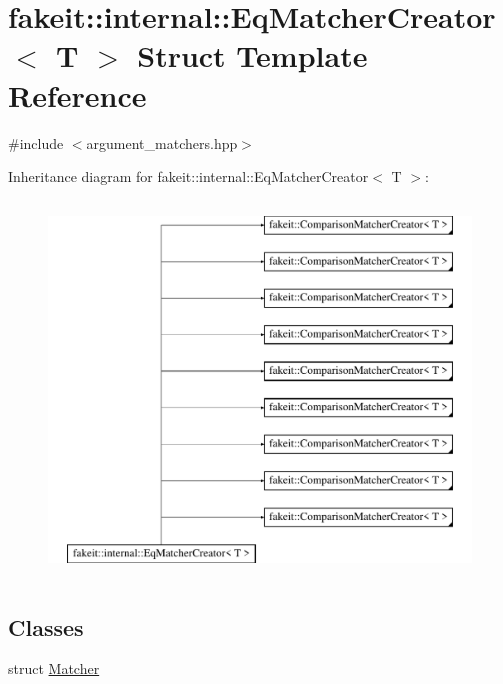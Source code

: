 \hypertarget{structfakeit_1_1internal_1_1EqMatcherCreator}{}\section{fakeit\+::internal\+::Eq\+Matcher\+Creator$<$ T $>$ Struct Template Reference}
\label{structfakeit_1_1internal_1_1EqMatcherCreator}


{\ttfamily \#include $<$argument\+\_\+matchers.\+hpp$>$}

Inheritance diagram for fakeit\+::internal\+::Eq\+Matcher\+Creator$<$ T $>$\+:\begin{figure}[H]
\begin{center}
\leavevmode
\includegraphics[height=10.000000cm]{structfakeit_1_1internal_1_1EqMatcherCreator}
\end{center}
\end{figure}
\subsection*{Classes}
\begin{DoxyCompactItemize}
\item 
struct \mbox{\hyperlink{structfakeit_1_1internal_1_1EqMatcherCreator_1_1Matcher}{Matcher}}
\end{DoxyCompactItemize}
